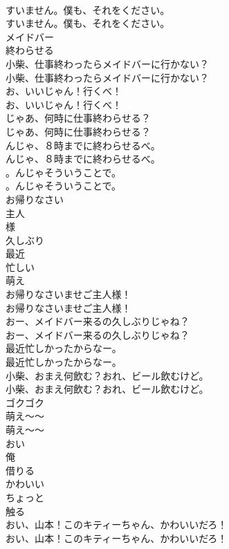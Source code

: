 \documentclass[8pt]{extreport}
\begin{document}
\begin{CJK}{UTF8}{min}
\\	すいません。僕も、それをください。	
\\	すいません。僕も、それをください。 
\\	メイドバー
\\	終わらせる
\\	小柴、仕事終わったらメイドバーに行かない？	
\\	小柴、仕事終わったらメイドバーに行かない？ 
\\	お、いいじゃん！行くべ！	
\\	お、いいじゃん！行くべ！ 
\\	じゃあ、何時に仕事終わらせる？	
\\	じゃあ、何時に仕事終わらせる？ 
\\	んじゃ、８時までに終わらせるべ。	
\\	んじゃ、８時までに終わらせるべ。 
\\	。んじゃそういうことで。	
\\	。んじゃそういうことで。 
\\	お帰りなさい
\\	主人
\\	様
\\	久しぶり
\\	最近
\\	忙しい
\\	萌え
\\	お帰りなさいませご主人様！	
\\	お帰りなさいませご主人様！ 
\\	おー、メイドバー来るの久しぶりじゃね？	
\\	おー、メイドバー来るの久しぶりじゃね？ 
\\	最近忙しかったからなー。	
\\	最近忙しかったからなー。 
\\	小柴、おまえ何飲む？おれ、ビール飲むけど。	
\\	小柴、おまえ何飲む？おれ、ビール飲むけど。 
\\	ゴクゴク	
\\	萌え～～
\\	萌え～～
\\	おい
\\	俺
\\	借りる
\\	かわいい
\\	ちょっと
\\	触る
\\	おい、山本！このキティーちゃん、かわいいだろ！	
\\	おい、山本！このキティーちゃん、かわいいだろ！ 

\end{CJK}
\end{document}
